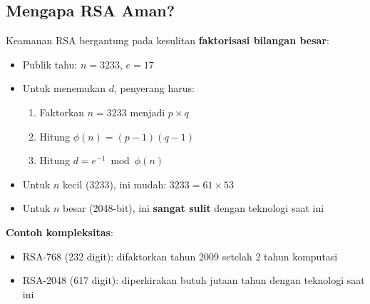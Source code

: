 \subsection{Mengapa RSA Aman?}

Keamanan RSA bergantung pada kesulitan \textbf{faktorisasi bilangan besar}:

\begin{itemize}
  \item Publik tahu: $n = 3233$, $e = 17$
  \item Untuk menemukan $d$, penyerang harus:
    \begin{enumerate}
      \item Faktorkan $n = 3233$ menjadi $p \times q$
      \item Hitung $\phi(n) = (p-1)(q-1)$
      \item Hitung $d = e^{-1} \bmod \phi(n)$
    \end{enumerate}
  \item Untuk $n$ kecil (3233), ini mudah: $3233 = 61 \times 53$
  \item Untuk $n$ besar (2048-bit), ini \textbf{sangat sulit} dengan teknologi saat ini
\end{itemize}

\textbf{Contoh kompleksitas}:
\begin{itemize}
  \item RSA-768 (232 digit): difaktorkan tahun 2009 setelah 2 tahun komputasi
  \item RSA-2048 (617 digit): diperkirakan butuh jutaan tahun dengan teknologi saat ini
\end{itemize}


